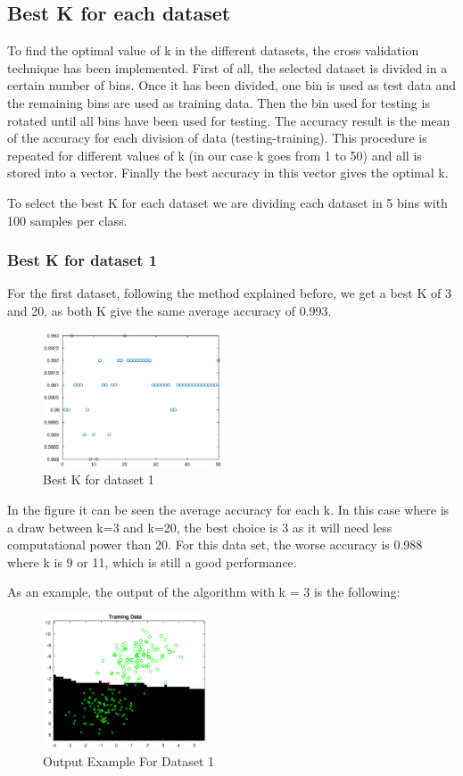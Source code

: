 \documentclass{article}
\begin{document}
\subsection{Best K for each dataset}
To find the optimal value of k in the different datasets, the cross validation technique has been implemented. First of all, the selected dataset is divided in a certain number of bins. Once it has been divided, one bin is used as test data and the remaining bins are used as training data. Then the bin used for testing is rotated until all bins have been used for testing. The accuracy result is the mean of the accuracy for each division of data (testing-training). This procedure is repeated for different values of k (in our case k goes from 1 to 50) and all is stored into a vector. Finally the best accuracy in this vector gives the optimal k.

To select the best K for each dataset we are dividing each dataset in 5 bins with 100 samples per class. 

\subsubsection {Best K for dataset 1}
For the first dataset, following the method explained before, we get a best K of 3 and 20, as both K give the same average accuracy of 0.993.

\begin{figure}[h!]
\centering
\includegraphics[height=4cm]{images/bestkdataset1}
\caption{Best K for dataset 1}
\label{fig:bestkdataset1}
\end{figure}

In the figure it can be seen the average accuracy for each k. In this case where is a draw between k=3 and k=20, the best choice is 3 as it will need less computational power than 20. For this data set, the worse accuracy is 0.988 where k is 9 or 11, which is still a good performance.

As an example, the output of the algorithm with k = 3 is the following:

\begin{figure}[H]
\centering
\includegraphics[height=4cm]{images/resultsknn1}
\caption{Output Example For Dataset 1}
\label{fig:resultsknn1}
\end{figure}
\end{document}
